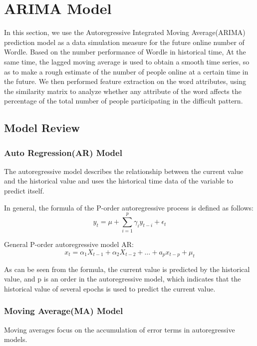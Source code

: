 \documentclass[12pt]{article}  %
\begin{document}
\section{ARIMA Model}
In this section, we use the Autoregressive Integrated Moving Average(ARIMA) prediction model as a data simulation measure for the future online number of Wordle. Based on the number performance of Wordle in historical time, At the same time, the lagged moving average is used to obtain a smooth time series, so as to make a rough estimate of the number of people online at a certain time in the future. We then performed feature extraction on the word attributes, using the similarity matrix to analyze whether any attribute of the word affects the percentage of the total number of people participating in the difficult pattern.


\subsection{Model Review}
\subsubsection{Auto Regression(AR) Model}
The autoregressive model describes the relationship between the current value and the historical value and uses the historical time data of the variable to predict itself.

In general, the formula of the P-order autoregressive process is defined as follows:
\begin{equation}\label{eq:AR_1}
    y_{t}=\mu+\sum_{i=1}^{p} \gamma_{i} y_{t-i}+\epsilon_{t}
\end{equation}

General P-order autoregressive model AR:
\begin{equation}\label{eq:AR_2}
    x_{t}=\alpha_{1} X_{t-1}+\alpha_{2} X_{t-2}+\ldots+a_{p} x_{t-p}+μ_{t}
\end{equation}

As can be seen from the formula, the current value is predicted by the historical value, and p is an order in the autoregressive model, which indicates that the historical value of several epochs is used to predict the current value.


\subsubsection{Moving Average(MA) Model}
Moving averages focus on the accumulation of error terms in autoregressive models.
\end{document}
